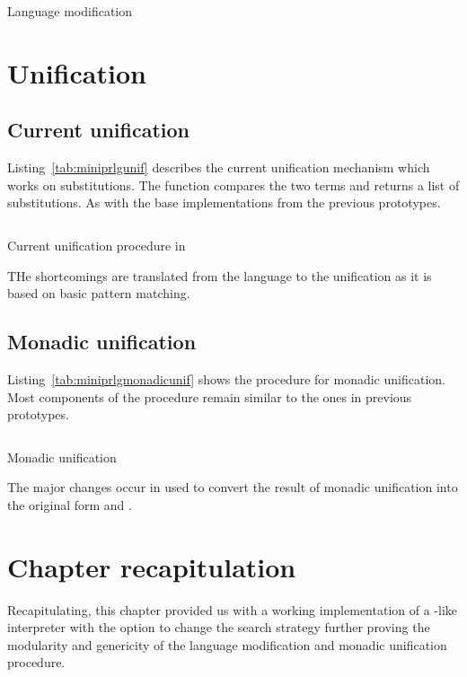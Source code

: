 \documentclass[thesis-solanki.tex]{files}
\begin{document}
\begin{code-list}[H]
\begin{singlespace}
  \inputminted[linenos, firstline=64, lastline=87]{haskell}{haskell-proto3-uplift-apart.hs}
\end{singlespace}
\caption{Language modification}
\label{tab:miniprlglangmod}
\end{code-list}

\section{Unification}

\subsection{Current unification}

Listing~\ref{tab:miniprlgunif} describes the current unification mechanism which works on  substitutions. The 
 function compares the two terms and returns a list of substitutions. As with the base implementations from
the previous prototypes.

\begin{code-list}[H]
\begin{singlespace}
  \inputminted[linenos, firstline=67, lastline=95]{haskell}{haskell-proto3-pentyl-skater.hs}
\end{singlespace}
\caption{Current unification procedure in \cite{website:mini-prolog-hugs98}}
\label{tab:miniprlgunif}
\end{code-list}

THe shortcomings are translated from the language to the unification as it is based on basic pattern matching.

\subsection{Monadic unification}
Listing~\ref{tab:miniprlgmonadicunif} shows the procedure for monadic unification. Most components of the procedure remain similar to the ones
in previous prototypes.
\begin{code-list}[H]
\begin{singlespace}
  \inputminted[linenos, firstline=1, lastline=42]{haskell}{haskell-proto3-bevy-icebox.hs}
\end{singlespace}
\caption{Monadic unification}
\label{tab:miniprlgmonadicunif}
\end{code-list}

The major changes occur in  used to convert the result of monadic unification into the original  form 
and .


\section{Chapter recapitulation}
Recapitulating, this chapter provided us with a working implementation of a -like interpreter with the option to change
the search strategy further proving the modularity and genericity of the language modification and monadic unification procedure.
\end{document}
